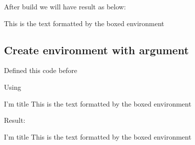 After build we will have result as below:

\begin{nbox}
This is the text formatted by the boxed environment
\end{nbox}

\subsection{Create environment with argument}

Defined this code before 
\begin{outputcfb}
\newenvironment{nbox}
  {%
    \begin{center}%
    \begin{tabular}{|p{0.7\textwidth}|} %
    \hline\\ %
    \bff{#1}\\ %
  }
  {
    \\\\\hline
    \end{tabular}
    \end{center}
  }
\end{outputcfb}

Using
\begin{outputcfb}
\begin{nboxt}{I'm title}
This is the text formatted by the boxed environment
\end{nboxt}
\end{outputcfb}

Result:

\begin{nboxt}{I'm title}
This is the text formatted by the boxed environment
\end{nboxt}
